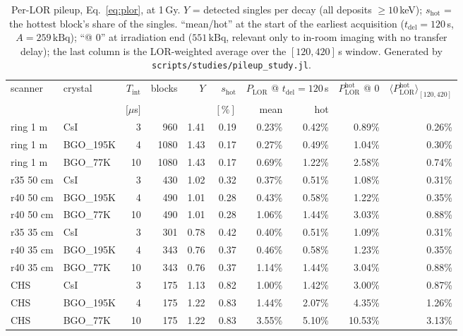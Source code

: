 \documentclass[11pt,a4paper]{article}
\newcommand{\kBq}{\,\mathrm{kBq}}
\newcommand{\Plor}{P_{\mathrm{LOR}}}
\begin{document}
\begin{table}[htb]
\centering
\small
\setlength{\tabcolsep}{4pt}
\begin{tabular}{llrrrrrrrr}
\toprule
scanner & crystal & $T_{\mathrm{int}}$ & blocks & $Y$ & $s_{\mathrm{hot}}$ &
\multicolumn{2}{c}{$\Plor$ @ $t_{\mathrm{del}}{=}120$\,s} & $\Plor^{\mathrm{hot}}$ @ 0 &
$\langle\Plor^{\mathrm{hot}}\rangle_{[120,420]}$ \\
 & & $[\mu$s$]$ & & & $[\%]$ & mean & hot & & \\
\midrule
ring 1 m & CsI & 3 & 960 & 1.41 & 0.19 & 0.23\% & 0.42\% & 0.89\% & 0.26\% \\
ring 1 m & BGO\_195K & 4 & 1080 & 1.43 & 0.17 & 0.27\% & 0.49\% & 1.04\% & 0.30\% \\
ring 1 m & BGO\_77K & 10 & 1080 & 1.43 & 0.17 & 0.69\% & 1.22\% & 2.58\% & 0.74\% \\
r35 50 cm & CsI & 3 & 430 & 1.02 & 0.32 & 0.37\% & 0.51\% & 1.08\% & 0.31\% \\
r40 50 cm & BGO\_195K & 4 & 490 & 1.01 & 0.28 & 0.43\% & 0.58\% & 1.22\% & 0.35\% \\
r40 50 cm & BGO\_77K & 10 & 490 & 1.01 & 0.28 & 1.06\% & 1.44\% & 3.03\% & 0.88\% \\
r35 35 cm & CsI & 3 & 301 & 0.78 & 0.42 & 0.40\% & 0.51\% & 1.09\% & 0.31\% \\
r40 35 cm & BGO\_195K & 4 & 343 & 0.76 & 0.37 & 0.46\% & 0.58\% & 1.23\% & 0.35\% \\
r40 35 cm & BGO\_77K & 10 & 343 & 0.76 & 0.37 & 1.14\% & 1.44\% & 3.04\% & 0.88\% \\
CHS & CsI & 3 & 175 & 1.13 & 0.82 & 1.00\% & 1.42\% & 3.00\% & 0.87\% \\
CHS & BGO\_195K & 4 & 175 & 1.22 & 0.83 & 1.44\% & 2.07\% & 4.35\% & 1.26\% \\
CHS & BGO\_77K & 10 & 175 & 1.22 & 0.83 & 3.55\% & 5.10\% & 10.53\% & 3.13\% \\
\bottomrule
\end{tabular}
\caption{Per-LOR pileup, Eq.~\eqref{eq:plor}, at 1\,Gy. $Y$ = detected singles per decay
(all deposits $\geq 10$\,keV); $s_{\mathrm{hot}}$ = the hottest block's share of the singles.
``mean/hot'' at the start of the earliest acquisition ($t_{\mathrm{del}}=120$\,s,
$A = 259\kBq$); ``@ 0'' at irradiation end ($551\kBq$, relevant only to in-room imaging with no
transfer delay); the last column is the LOR-weighted average over the $[120,420]$\,s window.
Generated by \texttt{scripts/studies/pileup\_study.jl}.}
\label{tab:pileup}
\end{table}
\end{document}
